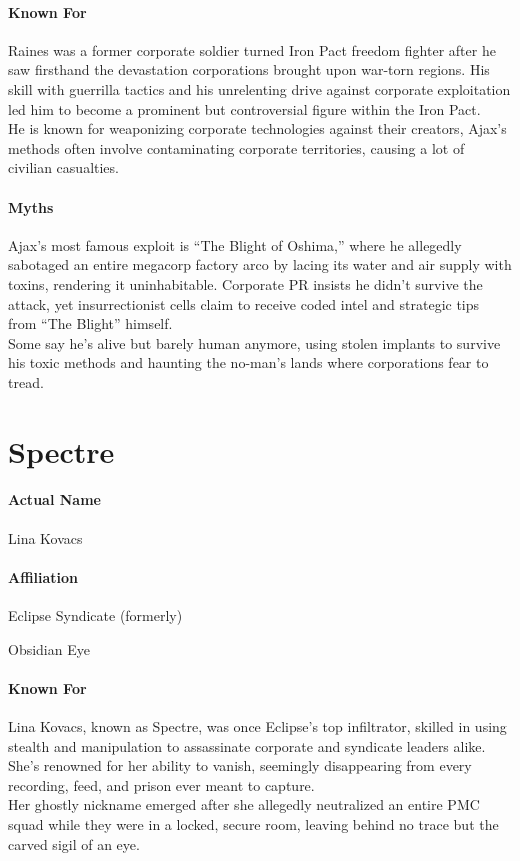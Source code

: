 \paragraph{Known For}
	Raines was a former corporate soldier turned Iron Pact freedom fighter after he saw firsthand the devastation corporations brought upon war-torn regions.
	His skill with guerrilla tactics and his unrelenting drive against corporate exploitation led him to become a prominent but controversial figure within the Iron Pact.
	\\%
	He is known for weaponizing corporate technologies against their creators, Ajax’s methods often involve contaminating corporate territories, causing a lot of civilian casualties.
\paragraph{Myths}
	Ajax’s most famous exploit is “The Blight of Oshima,” where he allegedly sabotaged an entire megacorp factory arco by lacing its water and air supply with toxins, rendering it uninhabitable.
	Corporate PR insists he didn’t survive the attack, yet insurrectionist cells claim to receive coded intel and strategic tips from “The Blight” himself.
	\\%
	Some say he’s alive but barely human anymore, using stolen implants to survive his toxic methods and haunting the no-man’s lands where corporations fear to tread.

\section*{Spectre}
\paragraph{Actual Name}
	Lina Kovacs
\paragraph{Affiliation}
	\begin{sitemize}
		\item Eclipse Syndicate (formerly)
		\item Obsidian Eye
	\end{sitemize}
\paragraph{Known For}
	Lina Kovacs, known as Spectre, was once Eclipse’s top infiltrator, skilled in using stealth and manipulation to assassinate corporate and syndicate leaders alike.
	She’s renowned for her ability to vanish, seemingly disappearing from every recording, feed, and prison ever meant to capture.
	\\%
	Her ghostly nickname emerged after she allegedly neutralized an entire PMC squad while they were in a locked, secure room, leaving behind no trace but the carved sigil of an eye.
